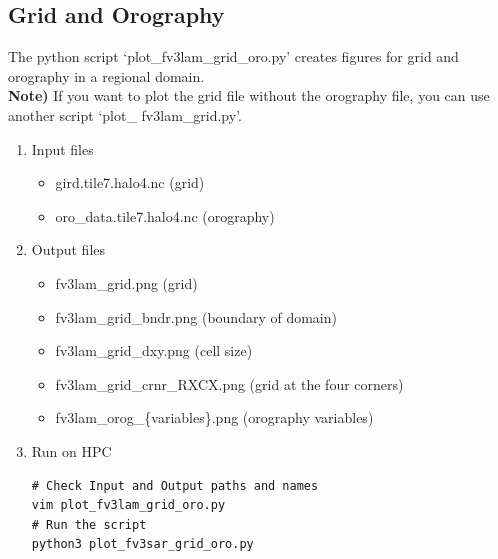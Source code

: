 \documentclass[11pt,fleqn]{report}              %
\begin{document}
\subsection{Grid and Orography}
\label{subsec:python_grid_oro}

The python script `plot\_fv3lam\_grid\_oro.py' creates figures for grid and orography in a regional domain. \\

{\bf Note)} If you want to plot the grid file without the orography file, you can use another script `plot\_ fv3lam\_grid.py'.

\begin{enumerate}
\item Input files
\begin{itemize}
\item gird.tile7.halo4.nc (grid)
\item oro\_data.tile7.halo4.nc (orography)
\end{itemize}
\item Output files
\begin{itemize}
\item fv3lam\_grid.png (grid)
\item fv3lam\_grid\_bndr.png (boundary of domain)
\item fv3lam\_grid\_dxy.png (cell size)
\item fv3lam\_grid\_crnr\_RXCX.png (grid at the four corners)
\item fv3lam\_orog\_\{variables\}.png  (orography variables)
\end{itemize}
\item Run on HPC

\lstset{language=bash}   
\begin{lstlisting}[frame=trBL]
# Check Input and Output paths and names
vim plot_fv3lam_grid_oro.py
# Run the script
python3 plot_fv3sar_grid_oro.py
\end{lstlisting}


\end{enumerate}
\end{document}
